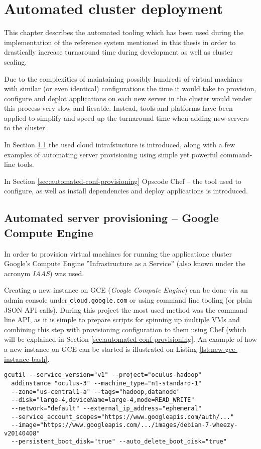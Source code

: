 \chapter{Automated cluster deployment}
\label{app:chef}
This chapter describes the automated tooling which has been used during the implementation of the reference system mentioned in this thesis in order to drastically increase turnaround time during development as well as cluster scaling.

Due to the complexities of maintaining possibly hundreds of virtual machines with similar (or even identical) configurations the time it would take to provision, configure and deplot applications on each new server in the cluster would render this process very slow and fiesable. Instead, tools and platforms have been applied to simplify and speed-up the turnaround time when adding new servers to the cluster. 

In Section \ref{sec:automated-server-provisioning} the used cloud intrafstucture is introduced, along with a few examples of automating server provisioning using simple yet powerful command-line tools. 

In Section \ref{sec:automated-conf-provisioning} Opscode Chef -- the tool used to configure, as well as install dependencies and deploy applications is introduced.

\section{Automated server provisioning -- Google Compute Engine}
\label{sec:automated-server-provisioning}

In order to provision virtual machines for running the applicationc cluster Google's Compute Engine ''Infrastructure as a Service'' (also known under the acronym \textit{IAAS}) was used. 

Creating a new instance on GCE (\textit{Google Compute Engine}) can be done via an admin console under \verb|cloud.google.com| or using command line tooling (or plain JSON API calls). During this project the most used method was the command line API, as it is simple to prepare scripts for spinning up multiple VMs and combining this step with provisioning configuration to them using Chef (which will be explained in Section \ref{sec:automated-conf-provisioning}. An example of how a new instance on GCE can be started is illustrated on Listing \ref{lst:new-gce-instance-bash}.

\begin{lstlisting}[caption={Creating new instance on GCE}, label={lst:new-gce-instance-bash}]
gcutil --service_version="v1" --project="oculus-hadoop" 
  addinstance "oculus-3" --machine_type="n1-standard-1" 
  --zone="us-central1-a" --tags="hadoop,datanode"
  --disk="large-4,deviceName=large-4,mode=READ_WRITE"
  --network="default" --external_ip_address="ephemeral" 
  --service_account_scopes="https://www.googleapis.com/auth/..." 
  --image="https://www.googleapis.com/.../images/debian-7-wheezy-v20140408" 
  --persistent_boot_disk="true" --auto_delete_boot_disk="true"
\end{lstlisting}



